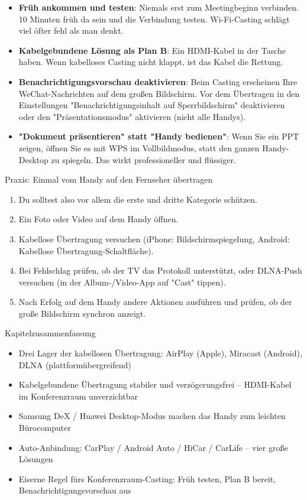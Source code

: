 \begin{itemize}
  \item \textbf{Früh ankommen und testen}: Niemals erst zum Meetingbeginn verbinden. 10 Minuten früh da sein und die Verbindung testen. Wi-Fi-Casting schlägt viel öfter fehl als man denkt.
  \item \textbf{Kabelgebundene Lösung als Plan B}: Ein HDMI-Kabel in der Tasche haben. Wenn kabelloses Casting nicht klappt, ist das Kabel die Rettung.
  \item \textbf{Benachrichtigungsvorschau deaktivieren}: Beim Casting erscheinen Ihre WeChat-Nachrichten auf dem großen Bildschirm. Vor dem Übertragen in den Einstellungen "Benachrichtigungsinhalt auf Sperrbildschirm" deaktivieren oder den "Präsentationsmodus" aktivieren (nicht alle Handys).
  \item \textbf{"Dokument präsentieren" statt "Handy bedienen"}: Wenn Sie ein PPT zeigen, öffnen Sie es mit WPS im Vollbildmodus, statt den ganzen Handy-Desktop zu spiegeln. Das wirkt professioneller und flüssiger.
\end{itemize}

\begin{tcbpractice}{Praxis: Einmal vom Handy auf den Fernseher übertragen}
\begin{enumerate}
  \item Du solltest also vor allem die erste und dritte Kategorie schützen.
  \item Ein Foto oder Video auf dem Handy öffnen.
  \item Kabellose Übertragung versuchen (iPhone: Bildschirmspiegelung, Android: Kabellose Übertragung-Schaltfläche).
  \item Bei Fehlschlag prüfen, ob der TV das Protokoll unterstützt, oder DLNA-Push versuchen (in der Album-/Video-App auf "Cast" tippen).
  \item Nach Erfolg auf dem Handy andere Aktionen ausführen und prüfen, ob der große Bildschirm synchron anzeigt.
\end{enumerate}

\end{tcbpractice}

\begin{tcbsummary}{Kapitelzusammenfassung}
\begin{itemize}
  \item Drei Lager der kabellosen Übertragung: AirPlay (Apple), Miracast (Android), DLNA (plattformübergreifend)
  \item Kabelgebundene Übertragung stabiler und verzögerungsfrei – HDMI-Kabel im Konferenzraum unverzichtbar
  \item Samsung DeX / Huawei Desktop-Modus machen das Handy zum leichten Bürocomputer
  \item Auto-Anbindung: CarPlay / Android Auto / HiCar / CarLife – vier große Lösungen
  \item Eiserne Regel fürs Konferenzraum-Casting: Früh testen, Plan B bereit, Benachrichtigungsvorschau aus
\end{itemize}

\end{tcbsummary}
